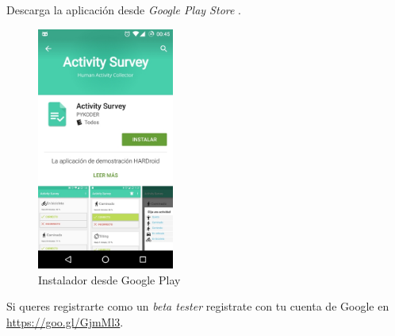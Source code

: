 Descarga la aplicación desde
\emph{Google Play Store} \cite{GimenezYegros2016e}.
\begin{figure}[!htbp]
    \centering 
    \includegraphics[width=0.4\textwidth]{anexos/graphics/inst_app5.jpg}
\caption{Instalador desde Google Play}\label{first:id2}\end{figure}

Si queres registrarte como un \emph{beta tester} registrate con tu cuenta de Google en \url{https://goo.gl/GjmMl3}.

